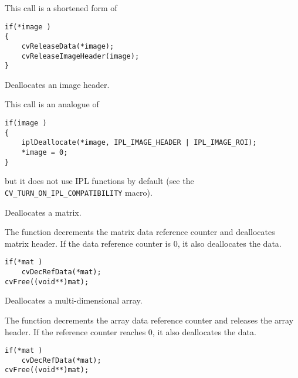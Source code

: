 This call is a shortened form of

\begin{lstlisting}
if(*image )
{
    cvReleaseData(*image);
    cvReleaseImageHeader(image);
}
\end{lstlisting}


Deallocates an image header.


\begin{description}
\end{description}

This call is an analogue of
\begin{lstlisting}
if(image )
{
    iplDeallocate(*image, IPL_IMAGE_HEADER | IPL_IMAGE_ROI);
    *image = 0;
}
\end{lstlisting}
but it does not use IPL functions by default (see the \texttt{CV\_TURN\_ON\_IPL\_COMPATIBILITY} macro).


Deallocates a matrix.


\begin{description}
\end{description}


The function decrements the matrix data reference counter and deallocates matrix header. If the data reference counter is 0, it also deallocates the data.

\begin{lstlisting}
if(*mat )
    cvDecRefData(*mat);
cvFree((void**)mat);
\end{lstlisting}


Deallocates a multi-dimensional array.


\begin{description}
\end{description}

The function decrements the array data reference counter and releases the array header. If the reference counter reaches 0, it also deallocates the data.

\begin{lstlisting}
if(*mat )
    cvDecRefData(*mat);
cvFree((void**)mat);
\end{lstlisting}

